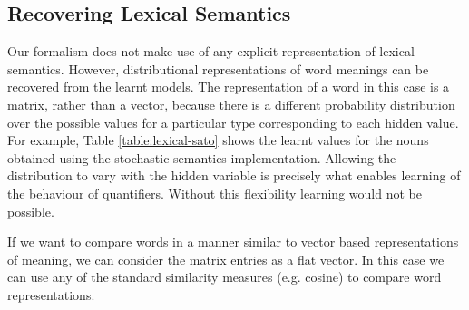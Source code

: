 \documentclass[11pt]{article}
\theoremstyle{definition}
\begin{document}

\subsection{Recovering Lexical Semantics}
\label{sec:recovering}

Our formalism does not make use of any explicit
representation of lexical semantics. However, distributional
representations of word meanings can be recovered from the learnt
models. The representation of a word in this case is a matrix, rather
than a vector, because there is a different probability distribution
over the possible values for a particular type corresponding to each
hidden value. For example, Table \ref{table:lexical-sato} shows the
learnt values for the nouns obtained using the stochastic semantics
implementation. Allowing the distribution to vary with the hidden
variable is precisely what enables learning of the behaviour of
quantifiers. Without this flexibility learning would not be possible.

If we want to compare words in a manner similar to vector based
representations of meaning, we can consider the matrix entries as a
flat vector. In this case we can use any of the standard similarity measures (e.g. 
cosine) to compare word representations.
\end{document}
